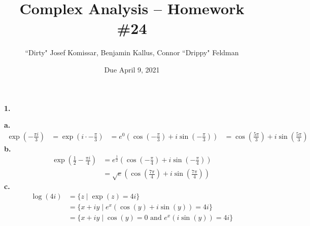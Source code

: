 \documentclass[11pt]{article}		%
\title{Complex Analysis -- Homework \#24}
\author{``Dirty" Josef Komissar, Benjamin Kallus, Connor ``Drippy" Feldman}
\date{Due April 9, 2021}
\theoremstyle{definition}
\begin{document}
\maketitle

\medskip\noindent\textbf{1.}

\medskip\textbf{a.}
\begin{align*}
    \exp\left(-\frac{\pi i}3\right) &= \exp\left(i \cdot -\frac{\pi}3\right)
                                    &=  e^0\left(\cos\left(-\frac{\pi}3\right) + i\sin\left(-\frac{\pi}3\right)\right)
                                    &= \cos\left(\frac{5\pi}3\right) + i\sin\left(\frac{5\pi}3\right)
\end{align*}
\medskip\textbf{b.}
\begin{align*}
    \exp\left(\frac12 - \frac{\pi i}4\right) &= e^{\frac12}\left( \cos\left(-\frac{\pi}4\right) + i\sin\left( -\frac{\pi}4 \right) \right) \\
                                             &= \sqrt{e}\left( \cos\left( \frac{7\pi}4 \right) + i\sin\left( \frac{7\pi}4 \right) \right)
\end{align*}
\medskip\textbf{c.}
\begin{align*}
    \log(4i) &= \{z \mid \exp(z) = 4i\} \\
             &= \{x+iy \mid e^x\left( \cos(y) + i\sin(y) \right) = 4i\} \\
             &= \{x+iy \mid \cos(y) = 0 \text{ and } e^x\left( i\sin(y) \right) = 4i\}
\end{align*}
\end{document}
